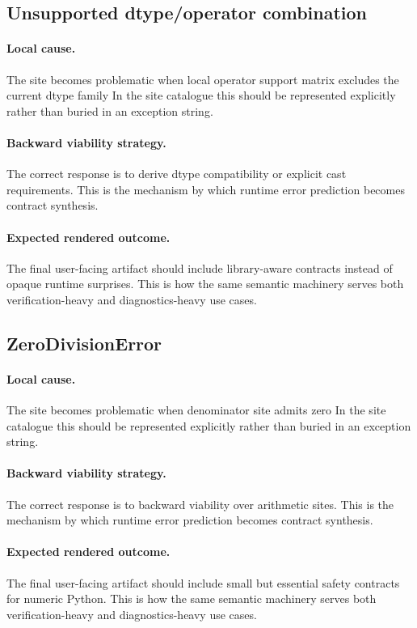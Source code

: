 \documentclass[11pt]{report}
\theoremstyle{definition}
\theoremstyle{plain}
\begin{document}
\subsection{Unsupported dtype/operator combination}

\paragraph{Local cause.}
The site becomes problematic when local operator support matrix excludes the current dtype family In the site catalogue this should be
represented explicitly rather than buried in an exception string.

\paragraph{Backward viability strategy.}
The correct response is to derive dtype compatibility or explicit cast requirements. This is the mechanism by which runtime
error prediction becomes contract synthesis.

\paragraph{Expected rendered outcome.}
The final user-facing artifact should include library-aware contracts instead of opaque runtime surprises. This is how the same
semantic machinery serves both verification-heavy and diagnostics-heavy use
cases.

\subsection{ZeroDivisionError}

\paragraph{Local cause.}
The site becomes problematic when denominator site admits zero In the site catalogue this should be
represented explicitly rather than buried in an exception string.

\paragraph{Backward viability strategy.}
The correct response is to backward viability over arithmetic sites. This is the mechanism by which runtime
error prediction becomes contract synthesis.

\paragraph{Expected rendered outcome.}
The final user-facing artifact should include small but essential safety contracts for numeric Python. This is how the same
semantic machinery serves both verification-heavy and diagnostics-heavy use
cases.
\end{document}
